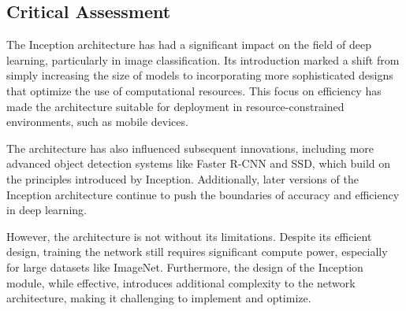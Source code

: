 \documentclass{article}
\begin{document}
\subsection{Critical Assessment}
The Inception architecture has had a significant impact on the field of deep learning, particularly in image classification. Its introduction marked a shift from simply increasing the size of models to incorporating more sophisticated designs that optimize the use of computational resources. This focus on efficiency has made the architecture suitable for deployment in resource-constrained environments, such as mobile devices.

The architecture has also influenced subsequent innovations, including more advanced object detection systems like Faster R-CNN and SSD, which build on the principles introduced by Inception. Additionally, later versions of the Inception architecture continue to push the boundaries of accuracy and efficiency in deep learning.

However, the architecture is not without its limitations. Despite its efficient design, training the network still requires significant compute power, especially for large datasets like ImageNet. Furthermore, the design of the Inception module, while effective, introduces additional complexity to the network architecture, making it  challenging to implement and optimize.



\end{document}
